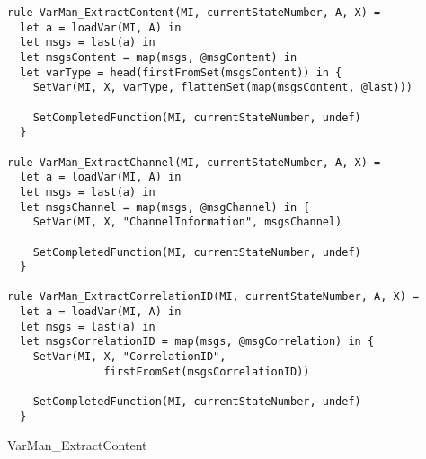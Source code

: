 \begin{listing}[H]
\begin{verbatim}
rule VarMan_ExtractContent(MI, currentStateNumber, A, X) =
  let a = loadVar(MI, A) in
  let msgs = last(a) in
  let msgsContent = map(msgs, @msgContent) in
  let varType = head(firstFromSet(msgsContent)) in {
    SetVar(MI, X, varType, flattenSet(map(msgsContent, @last)))

    SetCompletedFunction(MI, currentStateNumber, undef)
  }

rule VarMan_ExtractChannel(MI, currentStateNumber, A, X) =
  let a = loadVar(MI, A) in
  let msgs = last(a) in
  let msgsChannel = map(msgs, @msgChannel) in {
    SetVar(MI, X, "ChannelInformation", msgsChannel)

    SetCompletedFunction(MI, currentStateNumber, undef)
  }

rule VarMan_ExtractCorrelationID(MI, currentStateNumber, A, X) =
  let a = loadVar(MI, A) in
  let msgs = last(a) in
  let msgsCorrelationID = map(msgs, @msgCorrelation) in {
    SetVar(MI, X, "CorrelationID",
               firstFromSet(msgsCorrelationID))

    SetCompletedFunction(MI, currentStateNumber, undef)
  }
\end{verbatim}
\caption{VarMan\_ExtractContent}
\label{lst:asm:VarMan_ExtractContent}
\end{listing}




